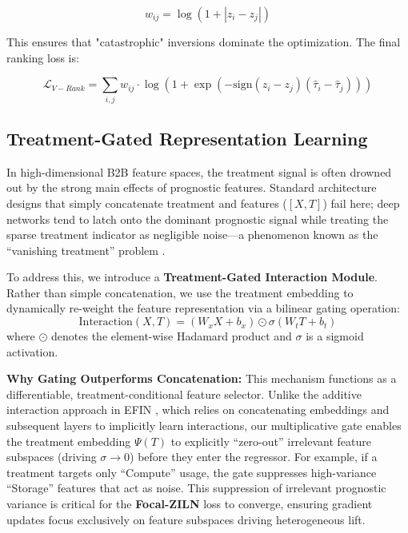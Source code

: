\documentclass[runningheads]{llncs}
\begin{document}
\begin{equation}
    w_{ij} = \log(1 + |z_i - z_j|)
\end{equation}

This ensures that "catastrophic" inversions dominate the optimization. The final ranking loss is:

\begin{equation}
    \mathcal{L}_{V-Rank} = \sum_{i,j} w_{ij} \cdot \log \left( 1 + \exp \left( - \text{sign}(z_i - z_j)(\hat{\tau}_i - \hat{\tau}_j) \right) \right)
\end{equation}

\subsection{Treatment-Gated Representation Learning}
In high-dimensional B2B feature spaces, the treatment signal is often drowned out by the strong main effects of prognostic features. Standard architecture designs that simply concatenate treatment and features ($[X, T]$) fail here; deep networks tend to latch onto the dominant prognostic signal while treating the sparse treatment indicator as negligible noise—a phenomenon known as the ``vanishing treatment'' problem \cite{efin2023}\cite{zhong2022descn}.

To address this, we introduce a \textbf{Treatment-Gated Interaction Module}. Rather than simple concatenation, we use the treatment embedding to dynamically re-weight the feature representation via a bilinear gating operation:
\begin{equation}
    \text{Interaction}(X, T) = (W_x X + b_x) \odot \sigma(W_t T + b_t)
\end{equation}
where $\odot$ denotes the element-wise Hadamard product and $\sigma$ is a sigmoid activation.

\textbf{Why Gating Outperforms Concatenation:} This mechanism functions as a differentiable, treatment-conditional feature selector. Unlike the additive interaction approach in EFIN \cite{efin2023}, which relies on concatenating embeddings and subsequent layers to implicitly learn interactions, our multiplicative gate enables the treatment embedding $\Psi(T)$ to explicitly ``zero-out'' irrelevant feature subspaces (driving $\sigma \to 0$) before they enter the regressor. For example, if a treatment targets only ``Compute'' usage, the gate suppresses high-variance ``Storage'' features that act as noise. This suppression of irrelevant prognostic variance is critical for the \textbf{Focal-ZILN} loss to converge, ensuring gradient updates focus exclusively on feature subspaces driving heterogeneous lift.
\end{document}
